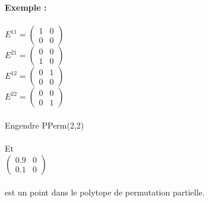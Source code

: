 \documentclass{book}
\begin{document}
 \textbf{Exemple :} \\\\
 $ E^{11}=\begin{pmatrix}
 1&0\\0&0
 \end{pmatrix} $ \\
 $ E^{21}=\begin{pmatrix}
 0&0\\1&0
 \end{pmatrix} $ \\
 $ E^{12}=\begin{pmatrix}
 0&1\\0&0
 \end{pmatrix} $\\
 $ E^{22}=\begin{pmatrix}
 0&0\\0&1
 \end{pmatrix} $\\\\
 Engendre PPerm(2,2)\\\\
 Et \\
 $\begin{pmatrix}
 0.9&0\\0.1&0
 \end{pmatrix} $\\\\ est un point dans le polytope de permutation partielle. \\\\
 
\end{document}

